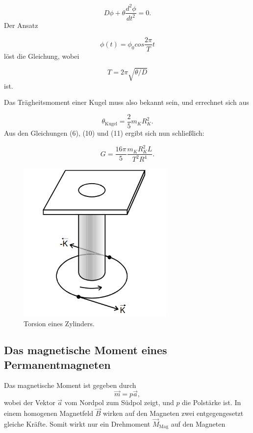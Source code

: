 \begin{equation}
  D\phi + \theta \frac{d^{2}\phi}{dt^{2}} = 0 .
\end{equation}
Der Ansatz

\begin{equation}
  \phi(t) = \phi_0 cos \frac{2\pi}{T}t 
\end{equation}
löst die Gleichung, wobei

\begin{equation}
  T = 2 \pi \sqrt{\theta/D}  
\end{equation}
ist.

Das Trägheitsmoment einer Kugel muss also bekannt sein, und errechnet sich aus

\begin{equation}
  \theta_\text{Kugel} = \frac{2}{5}m_K R_K^{2} .
\end{equation}
Aus den Gleichungen (6), (10) und (11) ergibt sich nun schließlich:

\begin{equation}
 G = \frac{16\pi}{5} \frac{m_K R_K^{2}L}{T^{2}R^{4}} .
\end{equation}

\begin{figure}[H]
 \centering
  \includegraphics[height=8cm]{Screenshot (9).png}
  \caption{Torsion eines Zylinders.\cite{kent}}
  \label{fig:drill}
\end{figure}


\subsection{Das magnetische Moment eines Permanentmagneten}
Das magnetische Moment ist gegeben durch
\begin{equation}
  \vec{m} = p \vec{a} ,
\end{equation}
wobei der Vektor $\vec{a}$ vom Nordpol zum Südpol zeigt, und $p$ die Polstärke ist.
In einem homogenen Magnetfeld $\vec{B}$ wirken auf den Magneten zwei entgegengesetzt gleiche Kräfte. Somit wirkt nur ein Drehmoment $\vec{M}_\text{Mag}$
auf den Magneten

